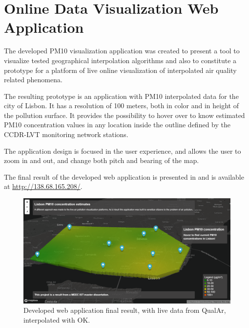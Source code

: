 
%

\section{Online Data Visualization Web Application}

The developed PM10 visualization application was created to present a tool to visualize tested geographical interpolation algorithms and also to constitute a prototype for a platform of live online visualization of interpolated air quality related phenomena.

The resulting prototype is an application with PM10 interpolated data for the city of Lisbon. It has a resolution of 100 meters, both in color and in height of the pollution surface. It provides the possibility to hover over to know estimated PM10 concentration values in any location inside the outline defined by the CCDR-LVT monitoring network stations.

The application design is focused in the user experience, and allows the user to zoom in and out, and change both pitch and bearing of the map.

The final result of the developed web application is presented in  and is available at \url{http://138.68.165.208/}.

\begin{figure}[ht]
\centering
\includegraphics[width=1\textwidth]{./Images/Results/developed-visualization.PNG}
\caption{Developed web application final result, with live data from QualAr, interpolated with OK.}
\label{fig:developed-visualization}
\end{figure}

